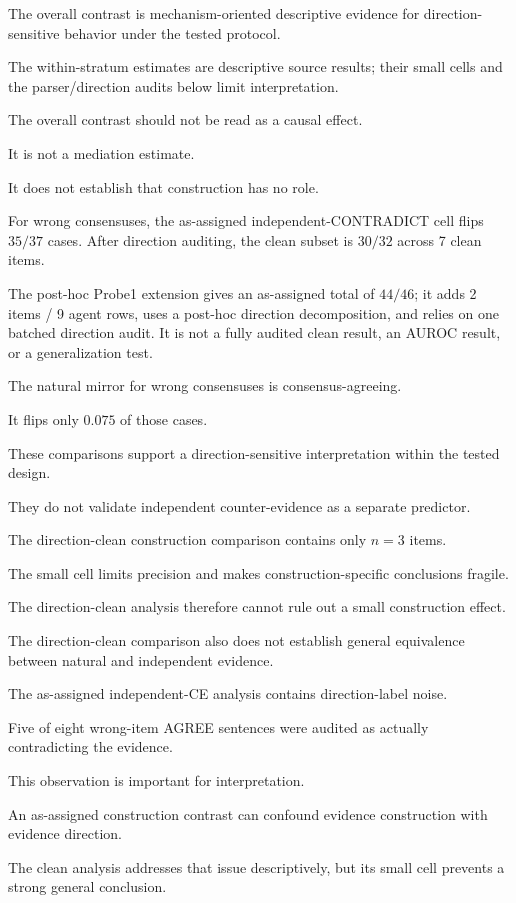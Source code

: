 \documentclass[11pt]{article}
\begin{document}
The overall contrast is mechanism-oriented descriptive evidence for direction-sensitive behavior under the tested protocol.

The within-stratum estimates are descriptive source results; their small cells and the parser/direction audits below limit interpretation.

The overall contrast should not be read as a causal effect.

It is not a mediation estimate.

It does not establish that construction has no role.

For wrong consensuses, the as-assigned independent-CONTRADICT cell flips \(35/37\) cases. After direction auditing, the clean subset is \(30/32\) across 7 clean items.

The post-hoc Probe1 extension gives an as-assigned total of \(44/46\); it adds 2 items / 9 agent rows, uses a post-hoc direction decomposition, and relies on one batched direction audit. It is not a fully audited clean result, an AUROC result, or a generalization test.

The natural mirror for wrong consensuses is consensus-agreeing.

It flips only \(0.075\) of those cases.

These comparisons support a direction-sensitive interpretation within the tested design.

They do not validate independent counter-evidence as a separate predictor.

The direction-clean construction comparison contains only \(n=3\) items.

The small cell limits precision and makes construction-specific conclusions fragile.

The direction-clean analysis therefore cannot rule out a small construction effect.

The direction-clean comparison also does not establish general equivalence between natural and independent evidence.

The as-assigned independent-CE analysis contains direction-label noise.

Five of eight wrong-item AGREE sentences were audited as actually contradicting the evidence.

This observation is important for interpretation.

An as-assigned construction contrast can confound evidence construction with evidence direction.

The clean analysis addresses that issue descriptively, but its small cell prevents a strong general conclusion.
\end{document}
